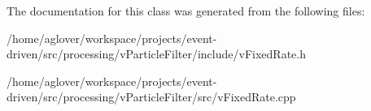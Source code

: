 The documentation for this class was generated from the following files\+:\begin{DoxyCompactItemize}
\item 
/home/aglover/workspace/projects/event-\/driven/src/processing/v\+Particle\+Filter/include/v\+Fixed\+Rate.\+h\item 
/home/aglover/workspace/projects/event-\/driven/src/processing/v\+Particle\+Filter/src/v\+Fixed\+Rate.\+cpp\end{DoxyCompactItemize}
